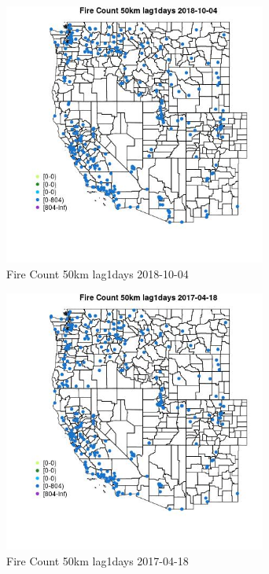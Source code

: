 \begin{figure} 
\centering  
\includegraphics[width=0.77\textwidth]{Code_Outputs/Report_ML_input_PM25_Step4_part_f_de_duplicated_aves_prioritize_24hr_obswNAs_MapObsFire_Count_50km_lag1days2018-10-04.jpg} 
\caption{\label{fig:Report_ML_input_PM25_Step4_part_f_de_duplicated_aves_prioritize_24hr_obswNAsMapObsFire_Count_50km_lag1days2018-10-04}Fire Count 50km lag1days 2018-10-04} 
\end{figure} 
 

\begin{figure} 
\centering  
\includegraphics[width=0.77\textwidth]{Code_Outputs/Report_ML_input_PM25_Step4_part_f_de_duplicated_aves_prioritize_24hr_obswNAs_MapObsFire_Count_50km_lag1days2017-04-18.jpg} 
\caption{\label{fig:Report_ML_input_PM25_Step4_part_f_de_duplicated_aves_prioritize_24hr_obswNAsMapObsFire_Count_50km_lag1days2017-04-18}Fire Count 50km lag1days 2017-04-18} 
\end{figure} 
 

